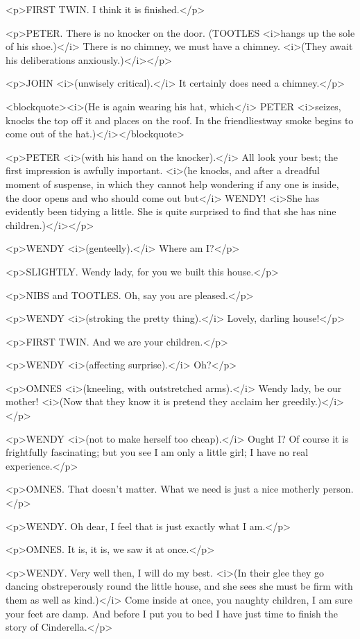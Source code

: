 <p>FIRST TWIN. I think it is finished.</p>

<p>PETER. There is no knocker on the door. (TOOTLES <i>hangs up the
sole of his shoe.)</i> There is no chimney, we must have a chimney.
<i>(They await his deliberations anxiously.)</i></p>

<p>JOHN <i>(unwisely critical).</i> It certainly does need a
chimney.</p>

<blockquote><i>(He is again wearing his hat, which</i> PETER
<i>seizes, knocks the top off it and places on the roof. In the
friendliestway smoke begins to come out of the hat.)</i></blockquote>

<p>PETER <i>(with his hand on the knocker).</i> All look your best;
the first impression is awfully important. <i>(he knocks, and after a
dreadful moment of suspense, in which they cannot help wondering if
any one is inside, the door opens and who should come out but</i>
WENDY! <i>She has evidently been tidying a little. She is quite
surprised to find that she has nine children.)</i></p>

<p>WENDY <i>(genteelly).</i> Where am I?</p>

<p>SLIGHTLY. Wendy lady, for you we built this house.</p>

<p>NIBS and TOOTLES. Oh, say you are pleased.</p>

<p>WENDY <i>(stroking the pretty thing).</i> Lovely, darling
house!</p>

<p>FIRST TWIN. And we are your children.</p>

<p>WENDY <i>(affecting surprise).</i> Oh?</p>

<p>OMNES <i>(kneeling, with outstretched arms).</i> Wendy lady, be
our mother! <i>(Now that they know it is pretend they acclaim her
greedily.)</i></p>

<p>WENDY <i>(not to make herself too cheap).</i> Ought I? Of course
it is frightfully fascinating; but you see I am only a little girl; I
have no real experience.</p>

<p>OMNES. That doesn't matter. What we need is just a nice motherly
person.</p>

<p>WENDY. Oh dear, I feel that is just exactly what I am.</p>

<p>OMNES. It is, it is, we saw it at once.</p>

<p>WENDY. Very well then, I will do my best. <i>(In their glee they
go dancing obstreperously round the little house, and she sees she
must be firm with them as well as kind.)</i> Come inside at once, you
naughty children, I am sure your feet are damp. And before I put you
to bed I have just time to finish the story of Cinderella.</p>

